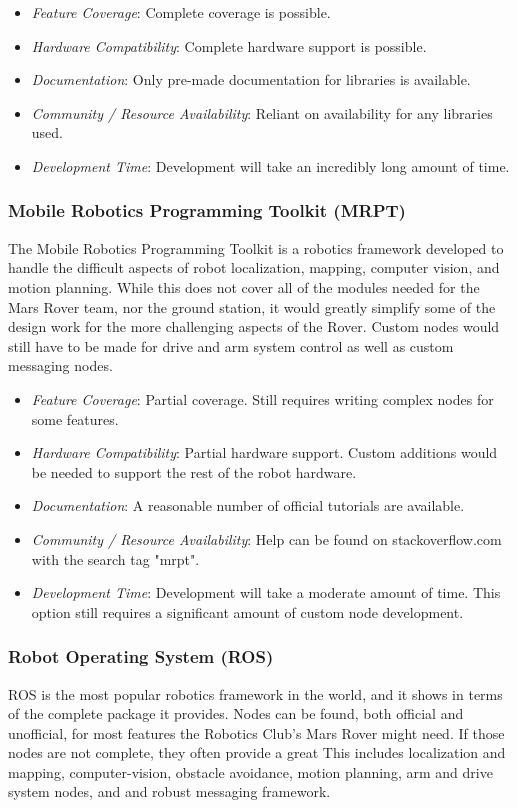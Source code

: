 \documentclass[onecolumn, draftclsnofoot, 10pt, compsoc]{IEEEtran}
\begin{document}
\begin{itemize}
\item \textit{Feature Coverage}: Complete coverage is possible.
\item \textit{Hardware Compatibility}: Complete hardware support is possible.
\item \textit{Documentation}: Only pre-made documentation for libraries is available.
\item \textit{Community / Resource Availability}: Reliant on availability for any libraries used.
\item \textit{Development Time}: Development will take an incredibly long amount of time.
\end{itemize}

\subsubsection{Mobile Robotics Programming Toolkit (MRPT)}
The Mobile Robotics Programming Toolkit is a robotics framework developed to handle the difficult aspects of robot localization, mapping, computer vision, and motion planning. 
While this does not cover all of the modules needed for the Mars Rover team, nor the ground station, it would greatly simplify some of the design work for the more challenging aspects of the Rover. 
Custom nodes would still have to be made for drive and arm system control as well as custom messaging nodes.

\begin{itemize}
\item \textit{Feature Coverage}: Partial coverage.
Still requires writing complex nodes for some features.
\item \textit{Hardware Compatibility}: Partial hardware support.
Custom additions would be needed to support the rest of the robot hardware.
\item \textit{Documentation}: A reasonable number of official tutorials are available.
\item \textit{Community / Resource Availability}: Help can be found on stackoverflow.com with the search tag "mrpt".
\item \textit{Development Time}: Development will take a moderate amount of time.
This option still requires a significant amount of custom node development.
\end{itemize}


\subsubsection{Robot Operating System (ROS)}
ROS is the most popular robotics framework in the world, and it shows in terms of the complete package it provides. 
Nodes can be found, both official and unofficial, for most features the Robotics Club's Mars Rover might need.
If those nodes are not complete, they often provide a great 
This includes localization and mapping, computer-vision, obstacle avoidance, motion planning, arm and drive system nodes, and and robust messaging framework.
\end{document}
